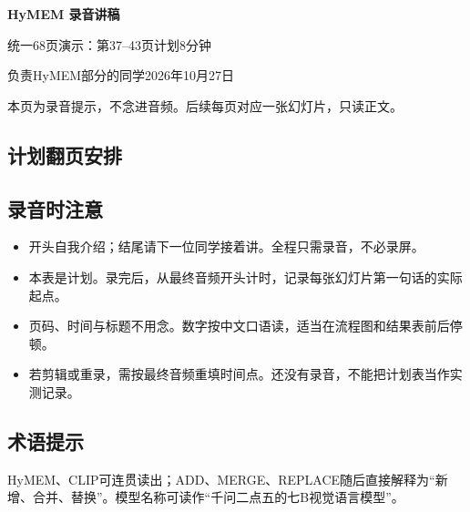 \documentclass[UTF8,fontset=fandol]{ctexart}
\providecommand{\speakername}{负责HyMEM部分的同学}
\begin{document}
\raggedbottom
\begin{center}{\Large\bfseries HyMEM 录音讲稿}\par
统一68页演示：第37--43页\quad 计划8分钟\par
\speakername\quad 2026年10月27日\end{center}
\noindent 本页为录音提示，不念进音频。后续每页对应一张幻灯片，只读正文。
\subsection*{计划翻页安排}
\par
\subsection*{录音时注意}
\begin{itemize}
\item 开头自我介绍；结尾请下一位同学接着讲。全程只需录音，不必录屏。
\item 本表是计划。录完后，从最终音频开头计时，记录每张幻灯片第一句话的实际起点。
\item 页码、时间与标题不用念。数字按中文口语读，适当在流程图和结果表前后停顿。
\item 若剪辑或重录，需按最终音频重填时间点。还没有录音，不能把计划表当作实测记录。
\end{itemize}
\subsection*{术语提示}
HyMEM、CLIP可连贯读出；ADD、MERGE、REPLACE随后直接解释为“新增、合并、替换”。模型名称可读作“千问二点五的七B视觉语言模型”。
\clearpage
{}
\end{document}
